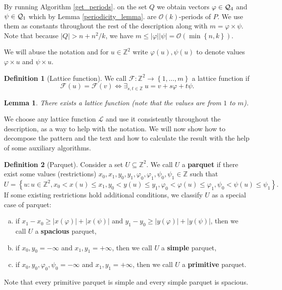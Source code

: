 \documentclass[11pt]{article}
\newcommand{\Z}{\mathbb{Z}}
\renewcommand{\O}{\mathcal{O}}
\renewcommand{\phi}{\varphi}
\newcommand{\set}[1]{\left\lbrace #1 \right\rbrace}
\theoremstyle{plain}
\newtheorem{lemma}{Lemma}
\theoremstyle{definition}
\newtheorem{definition}{Definition}
\begin{document}
By running Algorithm \ref{get_periods}. on the set $Q$ we obtain vectors $\phi \in \Q_4$ and $\psi \in \mathcal{Q}_1$ which by Lemma \ref{periodicity_lemma}. are $\O(k)$-periods of $P$.
We use them as constants throughout the rest of the description along with $m = \phi \times \psi$.
Note that because $|Q| > n + n^2 / k$, we have $m \le |\phi||\psi| = \O(\min\set{n, k})$.

We will abuse the notation and for $u \in \Z^2$ write $\phi(u), \psi(u)$ to denote values $\phi \times u$ and $\psi \times u$.


\renewcommand{\L}{\mathcal{L}}
\begin{definition}[Lattice function]
	We call $\mathcal{F} : \Z^2 \to \set{1, \dots, m}$ a lattice function if
	$$ \mathcal{F}(u) = \mathcal{F}(v) \Longleftrightarrow \exists_{s, t \in \Z} \ u = v + s\phi + t\psi. $$
\end{definition}
\begin{lemma}
	There exists a lattice function (note that the values are from $1$ to $m$).
\end{lemma}


We choose any lattice function $\L$ and use it consistently throughout the description, as a way to help with the notation.
We will now show how to decompose the pattern and the text and how to calculate the result with the help of some auxiliary algorithms.


\begin{definition}[Parquet]
	Consider a set $U \subseteq \Z^2$. We call $U$ a \textbf{parquet} if there exist some values (restrictions) $x_0, x_1, y_0, y_1, \phi_0, \phi_1, \psi_0, \psi_1 \in \Z$ such that
	$$ U = \set{u : u \in \Z^2, x_0 < x(u) \le x_1, y_0 < y(u) \le y_1, \phi_0 < \phi(u) \le \phi_1, \psi_0 < \psi(u) \le \psi_1}. $$
	If some existing restrictions hold additional conditions, we classify $U$ as a special case of parquet:
	\begin{enumerate}[a)]
		\item if $x_1 - x_0 \ge |x(\phi)| + |x(\psi)|$ and $y_1 - y_0 \ge |y(\phi)| + |y(\psi)|$, then we call $U$ a \textbf{spacious} parquet,
		\item if $x_0, y_0 = -\infty$ and $x_1, y_1 = +\infty$, then we call $U$ a \textbf{simple} parquet,
		\item if $x_0, y_0, \phi_0, \psi_0 = -\infty$ and $x_1, y_1 = +\infty$, then we call $U$ a \textbf{primitive} parquet.
	\end{enumerate}
	Note that every primitive parquet is simple and every simple parquet is spacious.
\end{definition}
\end{document}
